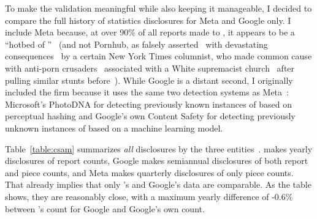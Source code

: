To make the validation meaningful while also keeping it manageable, I decided to
compare the full history of  statistics disclosures for Meta and
Google only. I include Meta because, at over 90\% of all reports made to ,
it appears to be a ``hotbed of ''~\cite{Hitt2021} (and not Pornhub, as
falsely asserted~\cite{Brown2020,Grant2020} with devastating
consequences~\cite{Celarier2021,Dickson2020,Harris2021,Stoya2021,GagliardoSilver2021}
by a certain New York Times columnist, who made common cause with anti-porn
crusaders~\cite{Hitt2020a} associated with a White supremacist
church~\cite{Halley2021,ProducerX2020} after pulling similar stunts
before~\cite{Bass2014,Brown2019,Dickson2014,Martin2012,Masnick2017,McCormack2012,Talusan2017}).
While Google is a distant second, I originally included the firm because it uses
the same two  detection systems as Meta~\cite{Allen2011,Davis2018}:
Microsoft's PhotoDNA for detecting previously known instances of  based on
perceptual hashing and Google's own Content Safety  for detecting
previously unknown instances of  based on a machine learning model.

Table~\ref{table:csam} summarizes \emph{all}  disclosures by the three
entities~\cite{NcmecByPlatform2019,NcmecByPlatform2020,NcmecByPlatform2021}.
 makes yearly disclosures of report counts, Google makes semiannual
disclosures of both report and piece counts, and Meta makes quarterly
disclosures of only piece counts. That already implies that only 's and
Google's data are comparable. As the table shows, they are reasonably close,
with a maximum yearly difference of -0.6\% between 's count for Google and
Google's own count.



